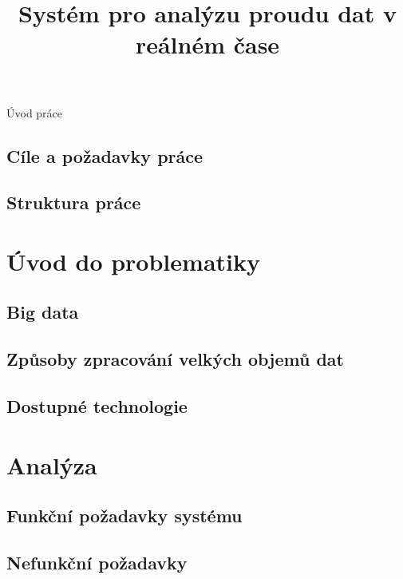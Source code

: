 \documentclass[thesis=B,czech]{FITthesis}[2012/06/26]
\title{Systém pro analýzu proudu dat v reálném čase}
\begin{document}

\begin{introduction}
	Úvod práce
	
\end{introduction}

	\section{Cíle a požadavky práce}
	\section{Struktura práce}
%


\chapter{Úvod do problematiky}
\section{Big data}
\section{Způsoby zpracování velkých objemů dat}
\section{Dostupné technologie}

\chapter{Analýza}
\section{Funkční požadavky systému}
\section{Nefunkční požadavky}
\end{document}
